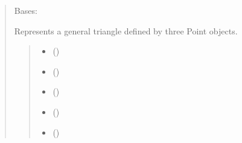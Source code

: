 \documentclass[letterpaper,10pt,english]{sphinxmanual}
\begin{document}
\begin{quote}
\begin{fulllineitems}
\begin{quote}
\begin{description}
\end{description}\end{quote}

\end{fulllineitems}


\begin{fulllineitems}
\label{\detokenize{pygeox:pygeox.custom_objects.Triangle}}
\pysigstartsignatures
\pysiglinewithargsret
{}
{\sphinxparamcomma {}\sphinxparamcomma {}\sphinxparamcomma {}\sphinxparamcomma {}\sphinxparamcomma {}}
{}
\pysigstopsignatures
\sphinxAtStartPar
Bases: 

\sphinxAtStartPar
Represents a general triangle defined by three Point objects.
\begin{quote}\begin{description}
\begin{itemize}
\item {} 
\sphinxAtStartPar
{} ()

\item {} 
\sphinxAtStartPar
{} ()

\item {} 
\sphinxAtStartPar
{} ()

\item {} 
\sphinxAtStartPar
{} (\sphinxstyleliteralemphasis{\sphinxupquote{ | }})

\item {} 
\sphinxAtStartPar
{} (\sphinxstyleliteralemphasis{\sphinxupquote{ | }})


\end{itemize}
\end{description}
\end{quote}
\end{fulllineitems}
\end{quote}
\end{document}

